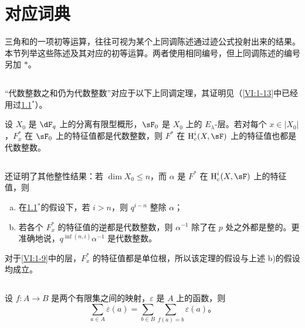 \section{对应词典}\label{VI:2}
三角和的一项初等运算，往往可视为某个上同调陈述通过迹公式投射出来的结果。本节列举这些陈述及其对应的初等运算。两者使用相同编号，但上同调陈述的编号另加 $\ast$。

\subsection{}\label{VI:2-1}
“代数整数之和仍为代数整数”对应于以下上同调定理，其证明见\cite[XXI 5.2.2]{sga7}（\ref{VI:1-13}中已经用过\ref{VI:2-1}$^\ast$）。
\begin{theorem*}[2.1*]\label{VI:2-1*}
设 $X_0$ 是 $\dF_q$ 上的分离有限型概形，$\sF_0$ 是 $X_0$ 上的 $E_\lambda$-层。若对每个 $x\in|X_0|$，$F_x^\ast$ 在 $\sF_0$ 上的特征值都是代数整数，则 $F^\ast$ 在 $\h_c^i(X,\sF)$ 上的特征值也都是代数整数。
\end{theorem*}

\subsection{}\label{VI:2-2}
\cite[XXI 5.2.2 和 5.4]{sga7}还证明了其他整性结果：若 $\dim X_0\leqslant n$，而 $\alpha$ 是 $F^\ast$ 在 $\h_c^i(X,\sF)$ 上的特征值，则
\begin{enumerate}[a)]
\item 在\ref{VI:2-1}$^\ast$的假设下，若 $i>n$，则 $q^{i-n}$ 整除 $\alpha$；
\item 若各个 $F_x^\ast$ 的特征值的逆都是代数整数，则 $\alpha^{-1}$ 除了在 $p$ 处之外都是整的。更准确地说，$q^{\inf(n,i)}\alpha^{-1}$ 是代数整数。
\end{enumerate}
对于\ref{VI:1-9}中的层，$F_x^\ast$ 的特征值都是单位根，所以该定理的假设与上述 b)的假设均成立。

\subsection{}\label{VI:2-3}
设 $f:A\to B$ 是两个有限集之间的映射，$\varepsilon$ 是 $A$ 上的函数，则
\begin{equation*}\tag{2.3.1}\label{VI:eq:2-3-1}
\sum_{a\in A}\varepsilon(a)=\sum_{b\in B}\sum_{f(a)=b}\varepsilon(a)\text{。}
\end{equation*}

